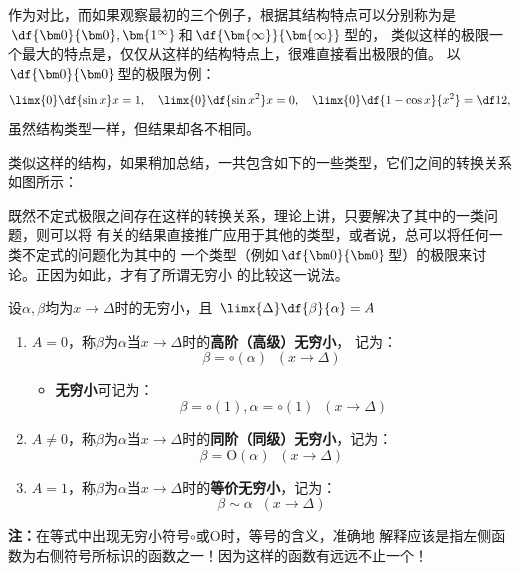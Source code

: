 作为对比，而如果观察最初的三个例子，根据其结构特点可以分别称为是
$\df{\bm0}{\bm0},\bm{1^{\infty}}$和$\df{\bm{\infty}}{\bm{\infty}}$型的，
类似这样的极限一个最大的特点是，仅仅从这样的结构特点上，很难直接看出极限的值。
以$\df{\bm0}{\bm0}$型的极限为例：
$$\limx{0}\df{\sin x}x=1,
\quad \limx{0}\df{\sin x^2}x=0,
\quad \limx{0}\df{1-\cos x}{x^2}=\df12,$$
虽然结构类型一样，但结果却各不相同。

类似这样的结构，如果稍加总结，一共包含如下的一些类型，它们之间的转换关系如图所示：

\begin{center}
\end{center}

既然不定式极限之间存在这样的转换关系，理论上讲，只要解决了其中的一类问题，则可以将
有关的结果直接推广应用于其他的类型，或者说，总可以将任何一类不定式的问题化为其中的
一个类型（例如$\df{\bm0}{\bm0}$型）的极限来讨论。正因为如此，才有了所谓无穷小
的比较这一说法。

\begin{thx}
	设$\alpha,\beta$均为$x\to\Delta$时的无穷小，且
	$\limx{\Delta}\df{\beta}{\alpha}=A$
	\begin{enumerate}[(1)]
	  \item $A=0$，称$\beta$为$\alpha$当$x\to\Delta$时的{\bf 高阶（高级）无穷小}，
	  记为：
	  $$\beta=\circ(\alpha)\;\;(x\to\Delta)$$
	  \begin{itemize}
	    \item {\bf 无穷小}可记为：
	    $$\beta=\circ(1),\alpha=\circ(1)\;\;(x\to\Delta)$$
	  \end{itemize}
	  \item $A\ne 0$，称$\beta$为$\alpha$当$x\to\Delta$时的{\bf 同阶（同级）无穷小}，记为：
	  $$\beta=\mathrm{O}(\alpha)\;\;(x\to\Delta)$$
	  \item $A=1$，称$\beta$为$\alpha$当$x\to\Delta$时的{\bf 等价无穷小}，记为：
	  $$\beta\sim \alpha\;\;(x\to\Delta)$$
	\end{enumerate}
\end{thx}
{\bf 注：}在等式中出现无穷小符号$\circ$或$\mathrm{O}$时，等号的含义，准确地
解释应该是指左侧函数为右侧符号所标识的函数之一！因为这样的函数有远远不止一个！

